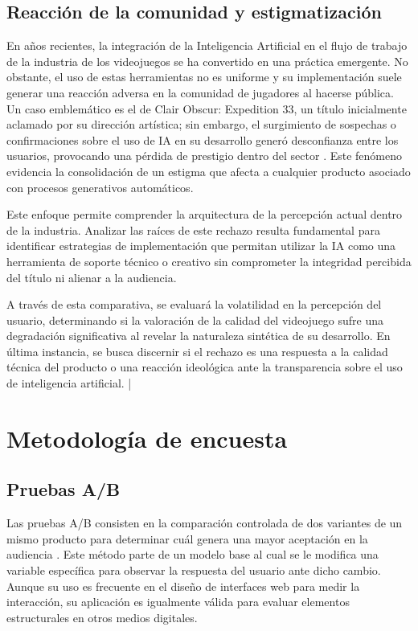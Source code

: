 \subsection{Reacción de la comunidad y estigmatización}

En años recientes, la integración de la Inteligencia Artificial en el flujo de trabajo de la industria de los videojuegos se ha convertido en una práctica emergente. No obstante, el uso de estas herramientas no es uniforme y su implementación suele generar una reacción adversa en la comunidad de jugadores al hacerse pública. Un caso emblemático es el de Clair Obscur: Expedition 33, un título inicialmente aclamado por su dirección artística; sin embargo, el surgimiento de sospechas o confirmaciones sobre el uso de IA en su desarrollo generó desconfianza entre los usuarios, provocando una pérdida de prestigio dentro del sector \cite{hollyhead2026clair}. Este fenómeno evidencia la consolidación de un estigma que afecta a cualquier producto asociado con procesos generativos automáticos.

Este enfoque permite comprender la arquitectura de la percepción actual dentro de la industria. Analizar las raíces de este rechazo resulta fundamental para identificar estrategias de implementación que permitan utilizar la IA como una herramienta de soporte técnico o creativo sin comprometer la integridad percibida del título ni alienar a la audiencia.

A través de esta comparativa, se evaluará la volatilidad en la percepción del usuario, determinando si la valoración de la calidad del videojuego sufre una degradación significativa al revelar la naturaleza sintética de su desarrollo. En última instancia, se busca discernir si el rechazo es una respuesta a la calidad técnica del producto o una reacción ideológica ante la transparencia sobre el uso de inteligencia artificial.
|

\section{Metodología de encuesta}
\subsection{Pruebas A/B}

Las pruebas A/B consisten en la comparación controlada de dos variantes de un mismo producto para determinar cuál genera una mayor aceptación en la audiencia \cite{oracle2026abtesting}. Este método parte de un modelo base al cual se le modifica una variable específica para observar la respuesta del usuario ante dicho cambio. Aunque su uso es frecuente en el diseño de interfaces web para medir la interacción, su aplicación es igualmente válida para evaluar elementos estructurales en otros medios digitales.

